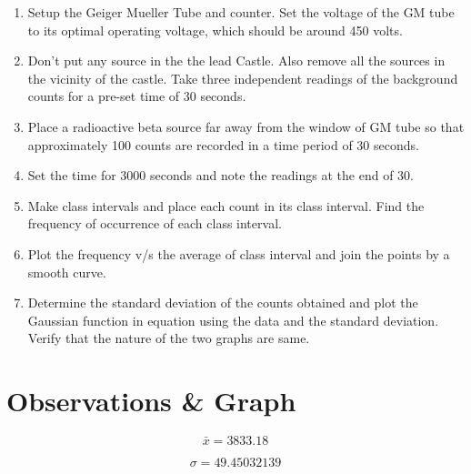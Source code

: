 	\begin{enumerate}
		\item 	 Setup the Geiger Mueller Tube and counter. Set the voltage of the GM tube to its optimal operating voltage, which should be around 450 volts.
		\item 	  Don’t put any source in the the lead Castle. Also remove all the sources in the vicinity of the castle. Take three independent readings of the background counts for a pre-set time of 30 seconds.
		\item 	 Place a radioactive beta source far away from the window of GM tube so that approximately 100 counts are recorded in a time period of 30 seconds.
		\item  Set the time for 3000 seconds and note the readings at the end of 30.
	    \item Make class intervals and place each count in its class interval. Find the frequency of occurrence of each class interval.
		\item  	Plot the frequency v/s the average of class interval and join the points by a smooth curve.
        \item Determine the standard deviation of the counts obtained and plot the Gaussian function in equation using the data and the standard deviation. Verify that the nature of the two graphs are same.
		
	\end{enumerate}
	
	\section{Observations \& Graph}
	\begin{equation}
	\bar{x}=3833.18
	\end{equation}
	
	\begin{equation}
	\sigma=49.45032139
	\end{equation}
	
